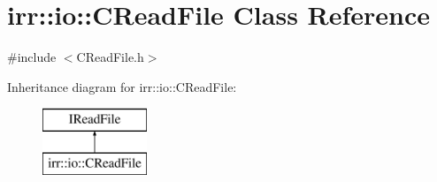 \hypertarget{classirr_1_1io_1_1_c_read_file}{\section{irr\-:\-:io\-:\-:C\-Read\-File Class Reference}
\label{classirr_1_1io_1_1_c_read_file}
}


{\ttfamily \#include $<$C\-Read\-File.\-h$>$}

Inheritance diagram for irr\-:\-:io\-:\-:C\-Read\-File\-:\begin{figure}[H]
\begin{center}
\leavevmode
\includegraphics[height=2.000000cm]{classirr_1_1io_1_1_c_read_file}
\end{center}
\end{figure}
